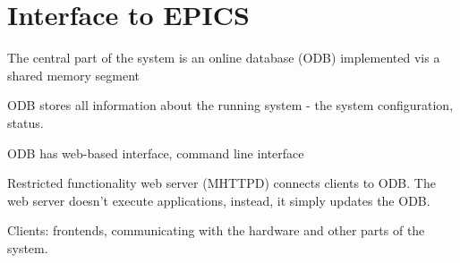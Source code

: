 \section{Interface to EPICS}

The central part of the system is an online database (ODB)
implemented vis a shared memory segment

ODB stores all information about the running system -
the system configuration, status.

ODB has web-based interface, command line interface

Restricted functionality web server (MHTTPD) connects clients
to ODB. The web server doesn't execute applications, instead,
it simply updates the ODB.

Clients: frontends, communicating with the hardware and other
parts of the system.




